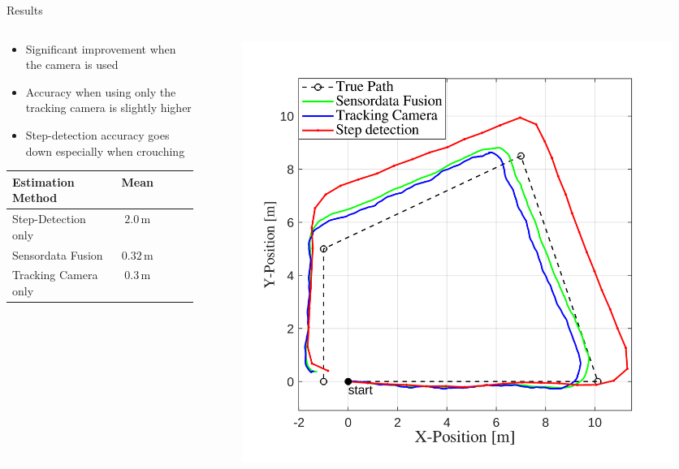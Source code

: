 \documentclass[aspectratio=169]{beamer}
\begin{document}
{	\begin{frame}{Results}
		\begin{columns}
			\begin{column}{0.45\textwidth}
				\begin{itemize}
					\item Significant improvement when the camera is used
					\item Accuracy when using only the tracking camera is slightly higher %
					\item Step-detection accuracy goes down especially when crouching
				\end{itemize}
				\begin{tabular}{lcccc}
					\toprule
					\textbf{Estimation Method}                  &   \textbf{Mean}      \\ \midrule
					Step-Detection only                              & $2.0\,\mathrm{m}$   \\
					Sensordata Fusion                           & $0.32\,\mathrm{m}$   \\
					Tracking Camera only & $0.3\,\mathrm{m}$  \\ \bottomrule
				\end{tabular}
			\end{column}
			\begin{column}{0.54\textwidth}
				\begin{figure}
					\centering
					\includegraphics[width=0.9\linewidth]{../Conference_Paper/Path2}
				\end{figure}
				

\end{column}
\end{columns}
\end{frame}}
\end{document}
